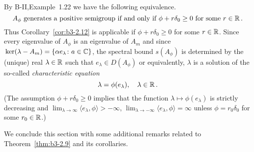 \begin{example}
\begin{enumerate}[\upshape (i), wide, labelindent=.5em]
By B-II,Example~1.22 we have the following equivalence.
\begin{equation}\label{eq:b3-2.29}
	A_{\phi} \text{ generates a positive semigroup if and only if } \phi + r\delta_{0} \geq 0 \text{ for some } r \in \mathbb{R}\,.
\end{equation}
Thus Corollary~\ref{cor:b3-2.12} is applicable if $\phi + r\delta_{0} \geq 0$ for some $r \in \mathbb{R}$.
Since every eigenvalue of $A_{\phi}$ is an eigenvalue of $A_{m}$ and since $\mathop{}\mathrm{ker}(\lambda-A_{m}) = \{\alpha e_{\lambda} \colon a \in \mathbb{C}\}$, the spectral bound $s(A_{\phi})$ is determined by the (unique) real $\lambda \in \mathbb{R}$ such that $e_{\lambda} \in D(A_{\phi})$ or equivalently, $\lambda$ is a solution of the so-called \emph{characteristic equation}
\begin{equation}\label{eq:b3-2.30}
	\lambda = \phi(e_{\lambda}), \quad \lambda \in \mathbb{R}\,.
\end{equation}
(The assumption $\phi + r\delta_{0} \geq 0$ implies that the function $\lambda \mapsto \phi(e_{\lambda})$ is strictly decreasing and $\lim_{\lambda \to \infty}\langle e_{\lambda},\phi \rangle > -\infty$, $\lim_{\lambda \to -\infty}\langle e_{\lambda},\phi \rangle = \infty$ unless $\phi = r_{0}\delta_{0}$ for some $r_{0} \in \mathbb{R}$.)
\end{enumerate}
\end{example}
We conclude this section with some additional remarks related to Theorem~\ref{thm:b3-2.9} and its corollaries.
